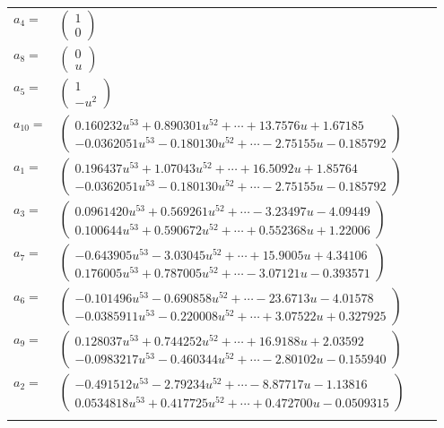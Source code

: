 \documentclass[1p]{elsarticle_modified}
\theoremstyle{definition}
\begin{document}
\begin{tabular}{m{7pt} m{180pt} m{7pt} m{180pt} }
\flushright $a_{4}=$&$\begin{pmatrix}1\\0\end{pmatrix}$ \\
\flushright $a_{8}=$&$\begin{pmatrix}0\\u\end{pmatrix}$ \\
\flushright $a_{5}=$&$\begin{pmatrix}1\\- u^2\end{pmatrix}$ \\
\flushright $a_{10}=$&$\begin{pmatrix}0.160232 u^{53}+0.890301 u^{52}+\cdots+13.7576 u+1.67185\\-0.0362051 u^{53}-0.180130 u^{52}+\cdots-2.75155 u-0.185792\end{pmatrix}$ \\
\flushright $a_{1}=$&$\begin{pmatrix}0.196437 u^{53}+1.07043 u^{52}+\cdots+16.5092 u+1.85764\\-0.0362051 u^{53}-0.180130 u^{52}+\cdots-2.75155 u-0.185792\end{pmatrix}$ \\
\flushright $a_{3}=$&$\begin{pmatrix}0.0961420 u^{53}+0.569261 u^{52}+\cdots-3.23497 u-4.09449\\0.100644 u^{53}+0.590672 u^{52}+\cdots+0.552368 u+1.22006\end{pmatrix}$ \\
\flushright $a_{7}=$&$\begin{pmatrix}-0.643905 u^{53}-3.03045 u^{52}+\cdots+15.9005 u+4.34106\\0.176005 u^{53}+0.787005 u^{52}+\cdots-3.07121 u-0.393571\end{pmatrix}$ \\
\flushright $a_{6}=$&$\begin{pmatrix}-0.101496 u^{53}-0.690858 u^{52}+\cdots-23.6713 u-4.01578\\-0.0385911 u^{53}-0.220008 u^{52}+\cdots+3.07522 u+0.327925\end{pmatrix}$ \\
\flushright $a_{9}=$&$\begin{pmatrix}0.128037 u^{53}+0.744252 u^{52}+\cdots+16.9188 u+2.03592\\-0.0983217 u^{53}-0.460344 u^{52}+\cdots-2.80102 u-0.155940\end{pmatrix}$ \\
\flushright $a_{2}=$&$\begin{pmatrix}-0.491512 u^{53}-2.79234 u^{52}+\cdots-8.87717 u-1.13816\\0.0534818 u^{53}+0.417725 u^{52}+\cdots+0.472700 u-0.0509315\end{pmatrix}$\\&\end{tabular}
\end{document}

